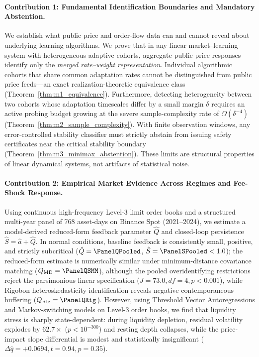 \documentclass[12pt]{article}
\theoremstyle{definition}
\theoremstyle{remark}
\begin{document}
\paragraph{Contribution 1: Fundamental Identification Boundaries and Mandatory Abstention.}
We establish what public price and order-flow data can and cannot reveal about underlying learning algorithms. We prove that in any linear market--learning system with heterogeneous adaptive cohorts, aggregate public price responses identify only the \emph{merged rate--weight representation}. Individual algorithmic cohorts that share common adaptation rates cannot be distinguished from public price feeds—an exact realization-theoretic equivalence class (Theorem~\ref{thm:m1_equivalence}). Furthermore, detecting heterogeneity between two cohorts whose adaptation timescales differ by a small margin $\delta$ requires an active probing budget growing at the severe sample-complexity rate of $\Omega(\delta^{-4})$ (Theorem~\ref{thm:m2_sample_complexity}). With finite observation windows, any error-controlled stability classifier must strictly abstain from issuing safety certificates near the critical stability boundary (Theorem~\ref{thm:m3_minimax_abstention}). These limits are structural properties of linear dynamical systems, not artifacts of statistical noise.

\paragraph{Contribution 2: Empirical Market Evidence Across Regimes and Fee-Shock Response.}
Using continuous high-frequency Level-3 limit order books and a structured multi-year panel of 768 asset-days on Binance Spot (2021--2024), we estimate a model-derived reduced-form feedback parameter $\hat{Q}$ and closed-loop persistence $\hat{S} = \hat{a} + \hat{Q}$. In normal conditions, baseline feedback is consistently small, positive, and strictly subcritical ($\hat{Q} = \PanelQPooled$, $\hat{S} = \PanelSPooled < 1.0$); the reduced-form estimate is numerically similar under minimum-distance covariance matching ($Q_{\text{MD}} = \PanelQSMM$), although the pooled overidentifying restrictions reject the parsimonious linear specification ($J = 73.0, df = 4, p < 0.001$), while Rigobon heteroskedasticity identification reveals negative contemporaneous buffering ($Q_{\text{Rig}} = \PanelQRig$). However, using Threshold Vector Autoregressions and Markov-switching models on Level-3 order books, we find that liquidity stress is sharply state-dependent: during liquidity depletion, residual volatility explodes by $\mathbf{62.7\times}$ ($p < 10^{-300}$) and resting depth collapses, while the price-impact slope differential is modest and statistically insignificant ($\Delta \hat{q} = +0.0694, t = 0.94, p = 0.35$).
\end{document}

